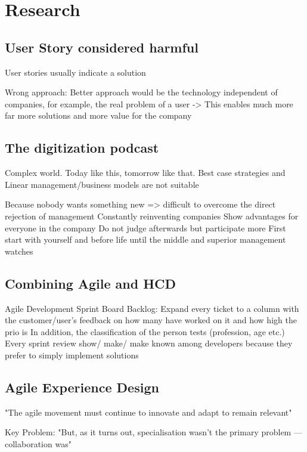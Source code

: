 %
\section*{Research}

\subsection{User Story considered harmful}
User stories usually indicate a solution

Wrong approach:
Better approach would be the technology independent of companies, for example, the real problem of a user -> This enables much more far more solutions and more value for the company
\citep{userstor59:online}

\subsection{The digitization podcast}
Complex world.
Today like this, tomorrow like that.
Best case strategies and
Linear management/business models are not suitable

Because nobody wants something new => difficult to overcome the direct rejection of management
Constantly reinventing companies
Show advantages for everyone in the company
Do not judge afterwards but participate more
First start with yourself and before life until the middle and superior management watches


\subsection{Combining Agile and HCD}
Agile Development Sprint Board Backlog:
Expand every ticket to a column with the customer/user's feedback on how many have worked on it and how high the prio is
In addition, the classification of the person tests (profession, age etc.)
Every sprint review show/ make/ make known among developers because they prefer to simply implement solutions
\citep{nakao2014using}

\subsection{Agile Experience Design}
"The agile movement must continue to innovate and adapt to remain relevant" \citep{ratcliffe2011agile:fw}

Key Problem: "But, as it turns out, specialisation wasn't the primary problem — collaboration was" \citep{ratcliffe2011agile:fw}


